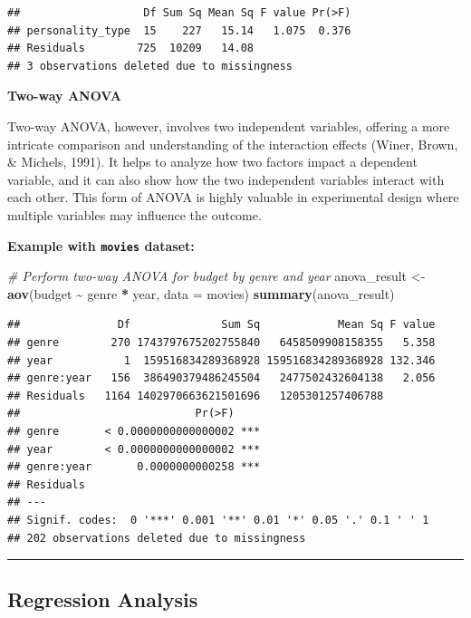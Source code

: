\documentclass[
  b5paper]{book}
\newenvironment{Shaded}{\begin{snugshade}}{\end{snugshade}}
\newcommand{\AttributeTok}[1]{\textcolor[rgb]{0.13,0.29,0.53}{#1}}
\newcommand{\CommentTok}[1]{\textcolor[rgb]{0.56,0.35,0.01}{\textit{#1}}}
\newcommand{\FunctionTok}[1]{\textcolor[rgb]{0.13,0.29,0.53}{\textbf{#1}}}
\newcommand{\NormalTok}[1]{#1}
\newcommand{\OtherTok}[1]{\textcolor[rgb]{0.56,0.35,0.01}{#1}}
\newcommand{\SpecialCharTok}[1]{\textcolor[rgb]{0.81,0.36,0.00}{\textbf{#1}}}
\begin{document}
\begin{verbatim}
##                   Df Sum Sq Mean Sq F value Pr(>F)
## personality_type  15    227   15.14   1.075  0.376
## Residuals        725  10209   14.08               
## 3 observations deleted due to missingness
\end{verbatim}

\textbf{Two-way ANOVA}

Two-way ANOVA, however, involves two independent variables, offering a more intricate comparison and understanding of the interaction effects (Winer, Brown, \& Michels, 1991). It helps to analyze how two factors impact a dependent variable, and it can also show how the two independent variables interact with each other. This form of ANOVA is highly valuable in experimental design where multiple variables may influence the outcome.

\textbf{Example with \texttt{movies} dataset:}

\begin{Shaded}
\begin{Highlighting}[]
\CommentTok{\# Perform two{-}way ANOVA for budget by genre and year}
\NormalTok{anova\_result }\OtherTok{\textless{}{-}} \FunctionTok{aov}\NormalTok{(budget }\SpecialCharTok{\textasciitilde{}}\NormalTok{ genre }\SpecialCharTok{*}\NormalTok{ year, }\AttributeTok{data =}\NormalTok{ movies)}
\FunctionTok{summary}\NormalTok{(anova\_result)}
\end{Highlighting}
\end{Shaded}

\begin{verbatim}
##               Df              Sum Sq            Mean Sq F value
## genre        270 1743797675202755840   6458509908158355   5.358
## year           1  159516834289368928 159516834289368928 132.346
## genre:year   156  386490379486245504   2477502432604138   2.056
## Residuals   1164 1402970663621501696   1205301257406788        
##                           Pr(>F)    
## genre       < 0.0000000000000002 ***
## year        < 0.0000000000000002 ***
## genre:year       0.0000000000258 ***
## Residuals                           
## ---
## Signif. codes:  0 '***' 0.001 '**' 0.01 '*' 0.05 '.' 0.1 ' ' 1
## 202 observations deleted due to missingness
\end{verbatim}

\begin{center}\rule{0.5\linewidth}{0.5pt}\end{center}

\hypertarget{regression-analysis}{%
\subsection*{Regression Analysis}\label{regression-analysis}}
\end{document}
